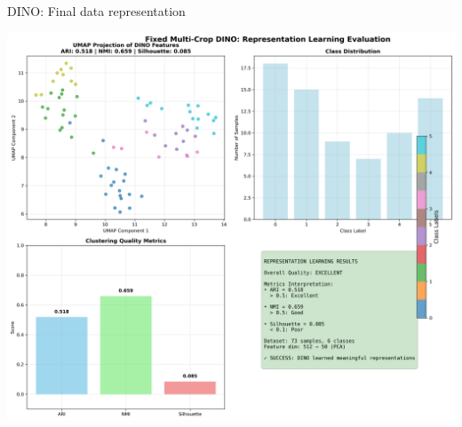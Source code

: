 \documentclass{beamer}
\begin{document}
\begin{frame}{DINO: Final data representation}

  \begin{center}
\includegraphics[scale=0.25]{./figs/dino_multicrop_representations.png}
  \end{center}

\end{frame}
\end{document}
